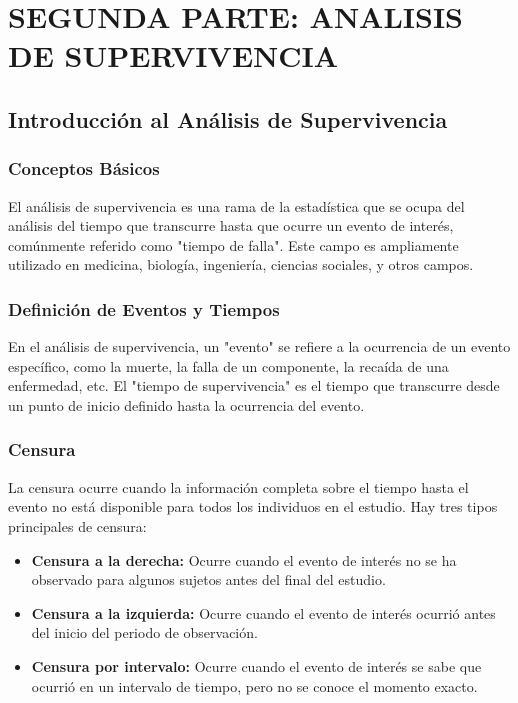 \documentclass[a4paper]{report} %
\begin{document}
\part{SEGUNDA PARTE: ANALISIS DE SUPERVIVENCIA}

\chapter{Introducci\'on al An\'alisis de Supervivencia}

\section{Conceptos B\'asicos}
El an\'alisis de supervivencia es una rama de la estad\'istica que se ocupa del an\'alisis del tiempo que transcurre hasta que ocurre un evento de inter\'es, com\'unmente referido como "tiempo de falla". Este campo es ampliamente utilizado en medicina, biolog\'ia, ingenier\'ia, ciencias sociales, y otros campos.

\section{Definici\'on de Eventos y Tiempos}
En el an\'alisis de supervivencia, un "evento" se refiere a la ocurrencia de un evento espec\'ifico, como la muerte, la falla de un componente, la reca\'ida de una enfermedad, etc. El "tiempo de supervivencia" es el tiempo que transcurre desde un punto de inicio definido hasta la ocurrencia del evento.

\section{Censura}
La censura ocurre cuando la informaci\'on completa sobre el tiempo hasta el evento no est\'a disponible para todos los individuos en el estudio. Hay tres tipos principales de censura:
\begin{itemize}
    \item \textbf{Censura a la derecha:} Ocurre cuando el evento de inter\'es no se ha observado para algunos sujetos antes del final del estudio.
    \item \textbf{Censura a la izquierda:} Ocurre cuando el evento de inter\'es ocurri\'o antes del inicio del periodo de observaci\'on.
    \item \textbf{Censura por intervalo:} Ocurre cuando el evento de inter\'es se sabe que ocurri\'o en un intervalo de tiempo, pero no se conoce el momento exacto.
\end{itemize}
\end{document}
